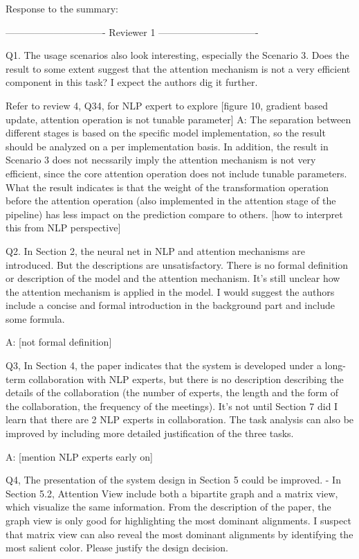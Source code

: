 Response to the summary:


------------------------------- Reviewer 1 -------------------------------


Q1. The usage scenarios also look interesting, especially the Scenario 3. Does the result to some extent suggest that the attention mechanism is not a very efficient component in this task? I expect the authors dig it further.

Refer to review 4, Q34, for NLP expert to explore
[figure 10, gradient based update, attention operation is not tunable parameter]
A: The separation between different stages is based on the specific model implementation, so the result should be analyzed on a per implementation basis. In addition, the result in Scenario 3 does not necssarily imply the attention mechanism is not very efficient, since the core attention operation does not include tunable parameters. What the result indicates is that the weight of the transformation operation before the attention operation (also implemented in the attention stage of the pipeline) has less impact on the prediction compare to others.  [how to interpret this from NLP perspective]

Q2. In Section 2, the neural net in NLP and attention mechanisms are introduced. But the descriptions are unsatisfactory. There is no formal definition or description of the model and the attention mechanism. It's still unclear how the attention mechanism is applied in the model. I would suggest the authors include a concise and formal introduction in the background part and include some formula.

A: [not formal definition]

Q3, In Section 4, the paper indicates that the system is developed under a long-term collaboration with NLP experts, but there is no description describing the details of the collaboration (the number of experts, the length and the form of the collaboration, the frequency of the meetings). It's not until Section 7 did I learn that there are 2 NLP experts in collaboration. The task analysis can also be improved by including more detailed justification of the three tasks.

A: [mention NLP experts early on]

Q4, The presentation of the system design in Section 5 could be improved.
- In Section 5.2, Attention View include both a bipartite graph and a matrix view, which visualize the same information. From the description of the paper, the graph view is only good for highlighting the most dominant alignments. I suspect that matrix view can also reveal the most dominant alignments by identifying the most salient color. Please justify the design decision.

